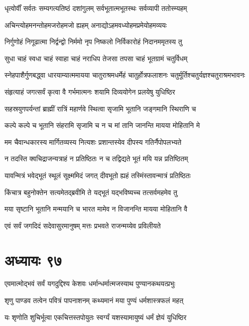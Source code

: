 \twolineshloka
{धृत्वोर्वीं सर्वतः सम्यगत्यतिष्ठं दशांगुलम्}
{सर्वभूतात्मभूतस्थः सर्वव्यापी ततोस्म्यहम्}


\twolineshloka
{अचिन्त्योहमनन्तोहमजरोहमजो ह्यहम्}
{अनाद्योऽहमवध्योहमप्रमेयोहमव्ययः}


\twolineshloka
{निर्गुणोहं निगूढात्मा निर्द्वन्द्वो निर्ममो नृप}
{निष्कलो निर्विकारोहं निदानममृतस्य तु}


\twolineshloka
{सुधा चाहं स्वधा चाहं स्वाहा चाहं नराधिप}
{तेजसा तपसा चाहं भूतग्रामं चतुर्विधम्}


\threelineshloka
{स्नेहपाशैर्गुणबद्ध्वा धारयाम्यात्ममायया}
{चातुराश्रमधर्मेहं चातुर्होत्रफलाशनः}
{चतुर्मूर्तिश्चतुर्यज्ञश्चतुराश्रमभावनः}


\twolineshloka
{संहृत्याहं जगत्सर्वं कृत्वा वै गर्भमात्मनः}
{शयामि दिव्ययोगेन प्रलयेषु युधिष्ठिर}


\twolineshloka
{सहस्रयुगपर्यन्तां ब्राह्मीं रात्रिं महार्णवे}
{स्थित्वा सृजामि भूतानि जङ्गमानि स्थिराणि च}


\twolineshloka
{कल्पे कल्पे च भूतानि संहरामि सृजामि च}
{न च मां तानि जानन्ति मायया मोहितानि मे}


\twolineshloka
{मम चैवान्धकारस्य मार्गितव्यस्य नित्यशः}
{प्रशान्तस्येव दीपस्य गतिर्नैपोपलभ्यते}


\twolineshloka
{न तदस्ति क्वचिद्राजन्यत्राहं न प्रतिष्ठितः}
{न च तद्विद्यते भूतं मयि यन्न प्रतिष्ठितम्}


\twolineshloka
{यावन्मित्रं भवेद्भूतं स्थूलं सूक्ष्ममिदं जगत्}
{दीवभूतो ह्यहं तस्मिंस्तावन्मात्रं प्रतिष्ठितः}


\twolineshloka
{किंचात्र बहुनोक्तेन सत्यमेतद्ब्रवीमि ते}
{यद्भूतं यद्भविष्यच्च तत्सर्वमहमेव तु}


\twolineshloka
{मया सृष्टानि भूतानि मन्मयानि च भारत}
{मामेव न विजानन्ति मायया मोहितानि वै}


\twolineshloka
{एवं सर्वं जगदिदं सदेवासुरमानुषम्}
{मत्तः प्रभवते राजन्मय्येव प्रविलीयते}


\chapter{अध्यायः ९७}
\twolineshloka
{एवमात्मोद्भवं सर्वं यगदुद्दिश्य केशवः}
{धर्मान्धर्मात्मजस्याथ पुण्यानकथयत्प्रभुः}


\twolineshloka
{शृणु पाण्डव तत्वेन पवित्रं पापनाशनम्}
{कथ्यमानं मया पुण्यं धर्मशास्त्रफलं महत्}


\twolineshloka
{यः शृणोति शुचिर्भूत्वा एकचित्तस्तपोयुतः}
{स्वर्ग्यं यशस्यामायुष्यं धर्मं ज्ञेयं युधिष्ठिर}


